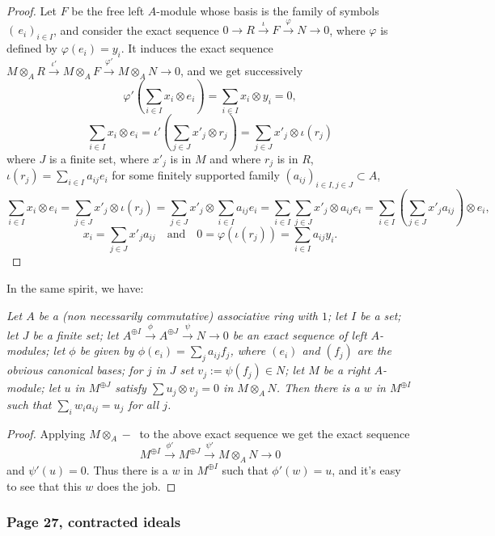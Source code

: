 \documentclass[12pt,letterpaper]{article}%
\newcommand{\nn}{\noindent}
\begin{document}
\begin{proof} 
Let $F$ be the free left $A$-module whose basis is the family of symbols $(\,e_i)_{i\in I}$, and consider the exact sequence $0\to R\xrightarrow\iota F\xrightarrow\varphi N\to 0$, where $\varphi$ is defined by $\varphi(e_i)=y_i$. It induces the exact sequence $M\otimes_AR\xrightarrow{\iota'}M\otimes_AF\xrightarrow{\varphi'}M\otimes_AN\to 0$, and we get successively
$$
\varphi'\left(\sum_{i\in I}x_i\otimes e_i\right)=\sum_{i\in I}x_i\otimes y_i=0,
$$ 
$$
\sum_{i\in I}x_i\otimes e_i=\iota'\left(\sum_{j\in J}x'_j\otimes r_j\right)=\sum_{j\in J}x'_j\otimes\iota(r_j)
$$ 
where $J$ is a finite set, where $x'_j$ is in $M$ and where $r_j$ is in $R$, $
\iota(r_j)=\sum_{i\in I}a_{ij}e_i$ for some finitely supported family $(a_{ij})_{i\in I,j\in J}\subset A$, 
$$
\sum_{i\in I}x_i\otimes e_i=\sum_{j\in J}x'_j\otimes\iota(r_j)=\sum_{j\in J} x'_j\otimes\sum_{i\in I}a_{ij}e_i=\sum_{i\in I}\sum_{j\in J} x'_j\otimes a_{ij}e_i=\sum_{i\in I}\left(\sum_{j\in J}x'_ja_{ij}\right)\otimes e_i,
$$ 
$$
x_i=\sum_{j\in J}x'_ja_{ij}\quad\text{and}\quad0=\varphi(\iota(r_j))=\sum_{i\in I}a_{ij}y_i.
$$ 
\end{proof}

In the same spirit, we have:

\nn\emph{Let $A$ be a (non necessarily commutative) associative ring with $1$; let $I$ be a set; let $J$ be a finite set; let $A^{\oplus I}\xrightarrow\phi A^{\oplus J}\xrightarrow\psi N\to0$ be an exact sequence of left $A$-modules; let $\phi$ be given by $\phi(e_i)=\sum_ja_{ij}f_j$, where $(e_i)$ and $(f_j)$ are the obvious canonical bases; for $j$ in $J$ set $v_j:=\psi(f_j)\in N$; let $M$ be a right $A$-module; let $u$ in $M^{\oplus J}$ satisfy $\sum u_j\otimes v_j=0$ in $M\otimes_AN$. Then there is a $w$ in $M^{\oplus I}$ such that $\sum_iw_ia_{ij}=u_j$ for all $j$.}

\begin{proof} 
Applying $M\otimes_A-\ $ to the above exact sequence we get the exact sequence 
$$
M^{\oplus I}\xrightarrow{\phi'}M^{\oplus J}\xrightarrow{\psi'}M\otimes_AN\to0
$$ 
and $\psi'(u)=0$. Thus there is a $w$ in $M^{\oplus I}$ such that $\phi'(w)=u$, and it's easy to see that this $w$ does the job. 
\end{proof}

\subsubsection{Page 27, contracted ideals}\label{27}%
\end{document}
